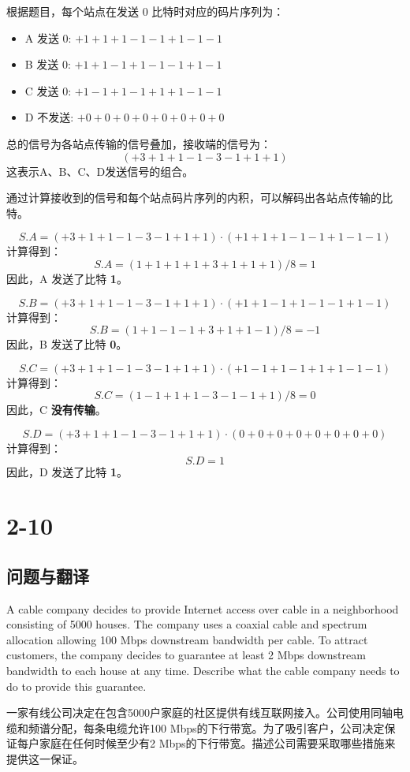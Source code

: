 根据题目，每个站点在发送 0 比特时对应的码片序列为：
\begin{itemize}
    \item A 发送 0: \(+1 +1 +1 -1 -1 +1 -1 -1\)
    \item B 发送 0: \(+1 +1 -1 +1 -1 -1 +1 -1\)
    \item C 发送 0: \(+1 -1 +1 -1 +1 +1 -1 -1\)
    \item D 不发送: \(+0 +0 +0 +0 +0 +0 +0 +0\)
\end{itemize}

总的信号为各站点传输的信号叠加，接收端的信号为：
\[
(+3 +1 +1 -1 -3 -1 +1 +1)
\]
这表示A、B、C、D发送信号的组合。

通过计算接收到的信号和每个站点码片序列的内积，可以解码出各站点传输的比特。

\[
S.A = ( +3 +1 +1 -1 -3 -1 +1 +1 ) \cdot ( +1 +1 +1 -1 -1 +1 -1 -1 )
\]
计算得到：
\[
S.A = (1+1+1+1+3+1+1+1)/8 = 1
\]
因此，A 发送了比特 \textbf{1}。

\[
S.B = ( +3 +1 +1 -1 -3 -1 +1 +1 ) \cdot ( +1 +1 -1 +1 -1 -1 +1 -1 )
\]
计算得到：
\[
S.B = (1+1-1-1+3+1+1-1)/8 = -1
\]
因此，B 发送了比特 \textbf{0}。

\[
S.C = ( +3 +1 +1 -1 -3 -1 +1 +1 ) \cdot ( +1 -1 +1 -1 +1 +1 -1 -1 )
\]
计算得到：
\[
S.C = (1-1+1+1-3-1-1+1)/8 = 0
\]
因此，C \textbf{没有传输}。

\[
S.D = ( +3 +1 +1 -1 -3 -1 +1 +1 ) \cdot ( 0 +0 +0 +0 +0 +0 +0 +0 )
\]
计算得到：
\[
S.D = 1
\]
因此，D 发送了比特 \textbf{1}。

\section{2-10}

\subsection{问题与翻译}

A cable company decides to provide Internet access over cable in a neighborhood consisting of 5000 houses. The company uses a coaxial cable and spectrum allocation allowing 100 Mbps downstream bandwidth per cable. To attract customers, the company decides to guarantee at least 2 Mbps downstream bandwidth to each house at any time. Describe what the cable company needs to do to provide this guarantee.

一家有线公司决定在包含5000户家庭的社区提供有线互联网接入。公司使用同轴电缆和频谱分配，每条电缆允许100 Mbps的下行带宽。为了吸引客户，公司决定保证每户家庭在任何时候至少有2 Mbps的下行带宽。描述公司需要采取哪些措施来提供这一保证。

